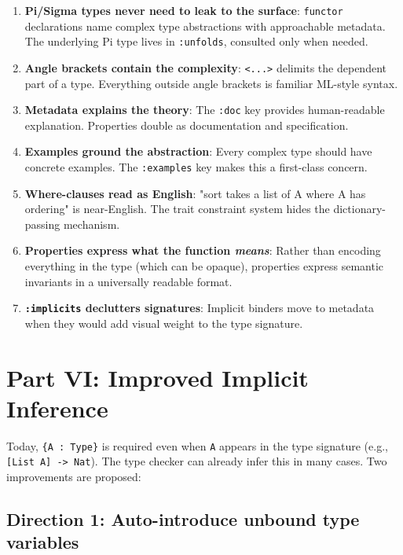\documentclass[11pt]{article}
\begin{document}
\begin{enumerate}
\item \textbf{Pi/Sigma types never need to leak to the surface}: \texttt{functor} declarations
name complex type abstractions with approachable metadata. The underlying
Pi type lives in \texttt{:unfolds}, consulted only when needed.

\item \textbf{Angle brackets contain the complexity}: \texttt{<...>} delimits the dependent part
of a type. Everything outside angle brackets is familiar ML-style syntax.

\item \textbf{Metadata explains the theory}: The \texttt{:doc} key provides human-readable
explanation. Properties double as documentation and specification.

\item \textbf{Examples ground the abstraction}: Every complex type should have concrete
examples. The \texttt{:examples} key makes this a first-class concern.

\item \textbf{Where-clauses read as English}: "sort takes a list of A where A has ordering"
is near-English. The trait constraint system hides the dictionary-passing
mechanism.

\item \textbf{Properties express what the function \emph{means}}: Rather than encoding
everything in the type (which can be opaque), properties express semantic
invariants in a universally readable format.

\item \textbf{\texttt{:implicits} declutters signatures}: Implicit binders move to metadata when
they would add visual weight to the type signature.
\end{enumerate}
\section{Part VI: Improved Implicit Inference}
\label{sec:org1651ace}

Today, \texttt{\{A : Type\}} is required even when \texttt{A} appears in the type signature
(e.g., \texttt{[List A] -> Nat}). The type checker can already infer this in many
cases. Two improvements are proposed:
\subsection{Direction 1: Auto-introduce unbound type variables}
\label{sec:orgc330027}
\end{document}
